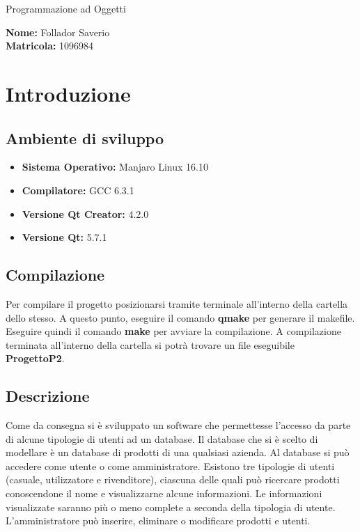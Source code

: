 \documentclass[a4paper,10pt] {article}
\begin{document}
\begin{center}

\begin{Huge} Programmazione ad Oggetti \end{Huge}

\vfill

\begin{Large} \textbf{Nome:} Follador Saverio \\ \textbf{Matricola:} 1096984 \end{Large}

\end{center}

\newpage

\tableofcontents

\newpage

\section{Introduzione}

\subsection{Ambiente di sviluppo}
\begin{itemize}
	\item \textbf{Sistema Operativo:} Manjaro Linux 16.10
	\item \textbf{Compilatore:} GCC 6.3.1
	\item \textbf{Versione Qt Creator:} 4.2.0
	\item \textbf{Versione Qt:} 5.7.1
\end{itemize}

\subsection{Compilazione}
Per compilare il progetto posizionarsi tramite terminale all'interno della cartella dello stesso. A questo punto, eseguire il comando \textbf{qmake} per generare
il makefile. Eseguire quindi il comando \textbf{make} per avviare la compilazione. A compilazione terminata all'interno della cartella si potrà trovare un file 
eseguibile \textbf{ProgettoP2}.

\subsection{Descrizione}
Come da consegna si è sviluppato un software che permettesse l'accesso da parte di alcune tipologie di utenti ad un database. Il database che si è scelto di 
modellare è un database di prodotti di una qualsiasi azienda. Al database si può accedere come utente o come amministratore. Esistono tre tipologie di utenti (casuale, utilizzatore e rivenditore), ciascuna delle quali può
ricercare prodotti conoscendone il nome e visualizzarne alcune informazioni. Le informazioni visualizzate saranno più o meno complete a seconda della tipologia
di utente. L'amministratore può inserire, eliminare o modificare prodotti e utenti.
\end{document}
